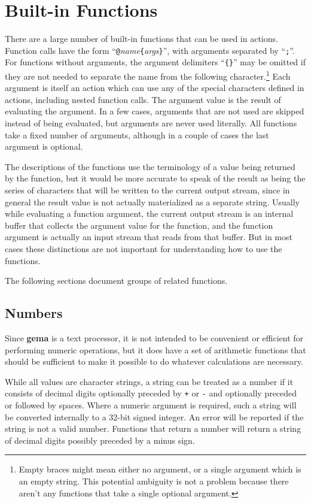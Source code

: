 
\section{Built-in Functions}
There are a large number of built-in functions that can be used in
actions.
Function calls have the form
``\verb|@|{\it name}\verb|{|{\it args}\verb|}|'', with arguments separated by
``\verb|;|''.
For functions
without arguments, the argument delimiters
``\verb|{}|''
may be omitted if they are not needed to separate the name from the following
character.\footnote{Empty braces might mean either no argument, or a
single argument which is an empty string.  This potential ambiguity is
not a problem because there aren't any functions that take a single
optional argument.}
Each argument is itself an action which can use any of the special
characters defined in actions, including nested function calls.
The argument value is the result of evaluating the argument.
In a few cases, arguments that are not used are skipped instead of
being evaluated, but arguments are never used literally.
All functions take a fixed number of arguments, although in a couple of cases
the last argument is optional.

The descriptions of the functions use the terminology of a value being
returned by the function, but it would be more accurate to speak of the
result as being the series of characters that will be written to the
current output stream, since in general the result value is not actually
materialized as a separate string.  Usually while evaluating a function
argument, the current output stream is an internal buffer that collects the
argument value for the function, and the function argument is actually an
input stream that reads from that buffer.  But in most cases these
distinctions are not important for understanding how to use the functions.

The following sections document groups of related functions.

\subsection{Numbers}
Since {\bf gema} is a text processor, it is not intended to be
convenient or efficient for performing numeric operations, but it does
have a set of arithmetic functions that should be sufficient to make it
possible to do whatever calculations are necessary.

While all values are character strings, a string can be treated as a
number if it consists of decimal digits optionally preceded by \verb/+/
or \verb/-/ and optionally preceded or followed by spaces.  Where a
numeric argument is required, such a string will be converted internally
to a 32-bit signed integer.  An error will be reported if the string is
not a valid number.
Functions that return a number will return a
string of decimal digits possibly preceded by a minus sign.

